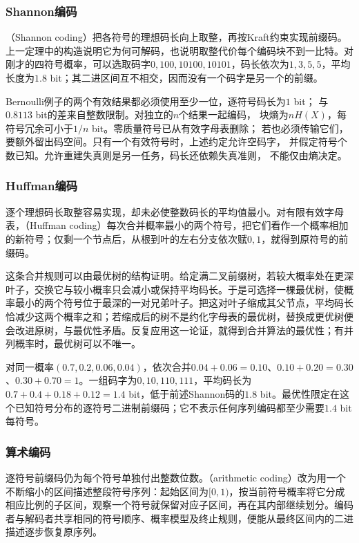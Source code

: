 \subsubsection{Shannon编码}
\label{sec:information-shannon-coding}
（Shannon coding）把各符号的理想码长向上取整，再按Kraft约束实现前缀码。上一定理中的构造说明它为何可解码，也说明取整代价每个编码块不到一比特。对刚才的四符号概率，可以选取码字\(0,100,10100,10101\)，码长依次为\(1,3,5,5\)，平均长度为\(1.8\) bit；其二进区间互不相交，因而没有一个码字是另一个的前缀。

Bernoulli例子的两个有效结果都必须使用至少一位，逐符号码长为\(1\) bit；
与\(0.8113\) bit的差来自整数限制。对独立的\(n\)个结果一起编码，
块熵为\(nH(X)\)，每符号冗余可小于\(1/n\) bit。零质量符号已从有效字母表删除；
若也必须传输它们，要额外留出码空间。只有一个有效符号时，上述约定允许空码字，
并假定符号个数已知。允许重建失真则是另一任务，码长还依赖失真准则，
不能仅由熵决定。

\subsubsection{Huffman编码}
\label{sec:information-huffman-coding}
逐个理想码长取整容易实现，却未必使整数码长的平均值最小。对有限有效字母表，（Huffman coding）每次合并概率最小的两个符号，把它们看作一个概率相加的新符号；仅剩一个节点后，从根到叶的左右分支依次赋\(0,1\)，就得到原符号的前缀码。

这条合并规则可以由最优树的结构证明。给定满二叉前缀树，若较大概率处在更深叶子，交换它与较小概率只会减小或保持平均码长。于是可选择一棵最优树，使概率最小的两个符号位于最深的一对兄弟叶子。把这对叶子缩成其父节点，平均码长恰减少这两个概率之和；若缩成后的树不是约化字母表的最优树，替换成更优树便会改进原树，与最优性矛盾。反复应用这一论证，就得到合并算法的最优性；有并列概率时，最优树可以不唯一。

对同一概率\((0.7,0.2,0.06,0.04)\)，依次合并\(0.04+0.06=0.10\)、\(0.10+0.20=0.30\)、\(0.30+0.70=1\)。一组码字为\(0,10,110,111\)，平均码长为\(0.7+0.4+0.18+0.12=1.4\) bit，低于前述Shannon码的\(1.8\) bit。最优性限定在这个已知符号分布的逐符号二进制前缀码；它不表示任何序列编码都至少需要\(1.4\) bit每符号。

\subsubsection{算术编码}
\label{sec:information-arithmetic-coding}
逐符号前缀码仍为每个符号单独付出整数位数。（arithmetic coding）改为用一个不断缩小的区间描述整段符号序列：起始区间为\([0,1)\)，按当前符号概率将它分成相应比例的子区间，观察一个符号就保留对应子区间，再在其内部继续划分。编码者与解码者共享相同的符号顺序、概率模型及终止规则，便能从最终区间内的二进描述逐步恢复原序列。

